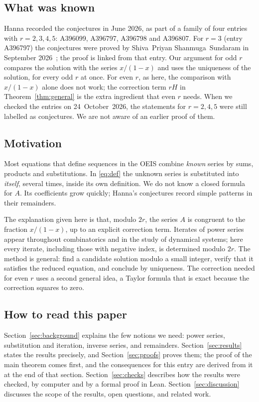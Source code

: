 \documentclass[11pt,a4paper]{article}
\theoremstyle{definition}
\theoremstyle{remark}
\begin{document}
\subsection{What was known}
Hanna recorded the conjectures in June 2026, as part of a family of four entries with $r=2,3,4,5$:
A396099, A396797, A396798 and A396807. For $r=3$ (entry A396797) the conjectures were proved by Shiva~Priyan
Shanmuga~Sundaram in September 2026~\cite{sundaram}; the proof is linked from that entry. Our argument for odd $r$ compares
the solution with the series $x/(1-x)$ and uses the uniqueness of the solution, for every odd $r$ at
once. For even $r$, as here, the comparison with $x/(1-x)$ alone does not work; the correction term $rH$ in
Theorem~\ref{thm:general} is the extra ingredient that even $r$ needs. When we checked the entries on
24~October~2026, the statements for $r=2,4,5$ were still labelled as conjectures. We are not aware of an earlier proof
of them.

\subsection{Motivation}
Most equations that define sequences in the OEIS combine \emph{known} series by sums, products and substitutions.
In \eqref{eq:def} the unknown series is substituted into \emph{itself}, several times, inside its own definition.
We do not know a closed formula for $A$. Its coefficients grow quickly; Hanna's conjectures record simple patterns in
their remainders.

The explanation given here is that, modulo $2r$, the series $A$ is congruent to the fraction $x/(1-x)$, up to an
explicit correction term. Iterates of power series appear throughout combinatorics and in the study of dynamical
systems; here every iterate, including those with negative index, is determined modulo $2r$. The method is general:
find a candidate solution modulo a small integer, verify that it satisfies the reduced equation, and conclude by
uniqueness. The correction needed for
even $r$ uses a second general idea, a Taylor formula that is exact because the correction squares to zero.

\subsection{How to read this paper}
Section~\ref{sec:background} explains the few notions we need: power series, substitution and iteration, inverse
series, and remainders. Section~\ref{sec:results} states the results precisely, and Section~\ref{sec:proofs} proves
them; the proof of the main theorem comes first, and the consequences for this entry are derived from it at the end of
that section. Section~\ref{sec:checks} describes how the results were checked, by computer and by a formal proof in
Lean. Section~\ref{sec:discussion} discusses the scope of the results, open questions, and related work.
\end{document}
